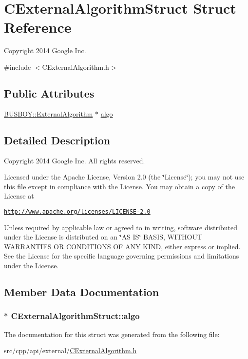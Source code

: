 \hypertarget{structCExternalAlgorithmStruct}{
\section{CExternalAlgorithmStruct Struct Reference}
\label{structCExternalAlgorithmStruct}
}


Copyright 2014 Google Inc.  


{\ttfamily \#include $<$CExternalAlgorithm.h$>$}\subsection*{Public Attributes}
\begin{DoxyCompactItemize}
\item 
\hyperlink{classBUSBOY_1_1ExternalAlgorithm}{BUSBOY::ExternalAlgorithm} $\ast$ \hyperlink{structCExternalAlgorithmStruct_aeb9660979977f88517b277e4ebe63a8d}{algo}
\end{DoxyCompactItemize}


\subsection{Detailed Description}
Copyright 2014 Google Inc. All rights reserved.

Licensed under the Apache License, Version 2.0 (the \char`\"{}License\char`\"{}); you may not use this file except in compliance with the License. You may obtain a copy of the License at

\href{http://www.apache.org/licenses/LICENSE-2.0}{\tt http://www.apache.org/licenses/LICENSE-\/2.0}

Unless required by applicable law or agreed to in writing, software distributed under the License is distributed on an \char`\"{}AS IS\char`\"{} BASIS, WITHOUT WARRANTIES OR CONDITIONS OF ANY KIND, either express or implied. See the License for the specific language governing permissions and limitations under the License. 

\subsection{Member Data Documentation}
\hypertarget{structCExternalAlgorithmStruct_aeb9660979977f88517b277e4ebe63a8d}{
\subsubsection[{algo}]{$\ast$ {\bf CExternalAlgorithmStruct::algo}}}
\label{structCExternalAlgorithmStruct_aeb9660979977f88517b277e4ebe63a8d}


The documentation for this struct was generated from the following file:\begin{DoxyCompactItemize}
\item 
src/cpp/api/external/\hyperlink{CExternalAlgorithm_8h}{CExternalAlgorithm.h}\end{DoxyCompactItemize}
